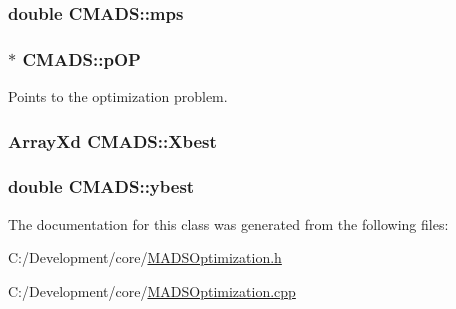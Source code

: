\hypertarget{class_c_m_a_d_s_a96712dada3b9eb67c28026ac994b5eb1}{
\subsubsection[{mps}]{\setlength{\rightskip}{0pt plus 5cm}double C\-M\-A\-D\-S\-::mps\hspace{0.3cm}{\ttfamily [protected]}}}\label{class_c_m_a_d_s_a96712dada3b9eb67c28026ac994b5eb1}
\hypertarget{class_c_m_a_d_s_a2df4d9f465992f6130c89fed7880e4e7}{
\subsubsection[{p\-O\-P}]{$\ast$ C\-M\-A\-D\-S\-::p\-O\-P\hspace{0.3cm}{\ttfamily [protected]}}}\label{class_c_m_a_d_s_a2df4d9f465992f6130c89fed7880e4e7}


Points to the optimization problem. 

\hypertarget{class_c_m_a_d_s_a632620e4e6de702a936648fe4bc8dbe1}{
\subsubsection[{Xbest}]{\setlength{\rightskip}{0pt plus 5cm}Array\-Xd C\-M\-A\-D\-S\-::\-Xbest\hspace{0.3cm}{\ttfamily [protected]}}}\label{class_c_m_a_d_s_a632620e4e6de702a936648fe4bc8dbe1}
\hypertarget{class_c_m_a_d_s_a81f3cabb204f7b152714f65a56f7dac4}{
\subsubsection[{ybest}]{\setlength{\rightskip}{0pt plus 5cm}double C\-M\-A\-D\-S\-::ybest\hspace{0.3cm}{\ttfamily [protected]}}}\label{class_c_m_a_d_s_a81f3cabb204f7b152714f65a56f7dac4}


The documentation for this class was generated from the following files\-:\begin{DoxyCompactItemize}
\item 
C\-:/\-Development/core/\hyperlink{_m_a_d_s_optimization_8h}{M\-A\-D\-S\-Optimization.\-h}\item 
C\-:/\-Development/core/\hyperlink{_m_a_d_s_optimization_8cpp}{M\-A\-D\-S\-Optimization.\-cpp}\end{DoxyCompactItemize}
